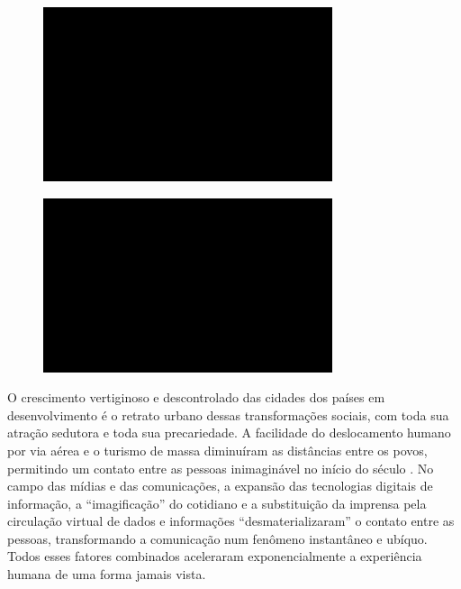 \begin{figure}[!ht]
\centering
 \includegraphics[width=85mm]{./imgs/im1.jpg}
\caption{\tiny{}}
\end{figure}

\begin{figure}[!ht]
\centering
 \includegraphics[width=85mm]{./imgs/im1.jpg}
\caption{\tiny{}}
\end{figure}

O crescimento vertiginoso e descontrolado das cidades dos países em
desenvolvimento é o retrato urbano dessas transformações sociais, com
toda sua atração sedutora e toda sua precariedade. A facilidade do
deslocamento humano por via aérea e o turismo de massa diminuíram as
distâncias entre os povos, permitindo um contato entre as pessoas
inimaginável no início do século . No campo das mídias e das
comunicações, a expansão das tecnologias digitais de informação, a
``imagificação'' do cotidiano e a substituição da imprensa pela
circulação virtual de dados e informações ``desmaterializaram'' o
contato entre as pessoas, transformando a comunicação num fenômeno
instantâneo e ubíquo. Todos esses fatores combinados aceleraram
exponencialmente a experiência humana de uma forma jamais vista.


